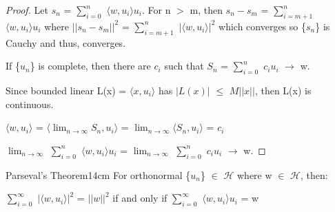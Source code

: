     \begin{proof}
        Let $s_n$ = $\sum_{i=0}^{n}$ $\langle w , u_i \rangle u_i$.
        For n $>$ m, then $s_n - s_m$
        = $\sum_{i=m+1}^{n}$ $\langle w , u_i \rangle u_i$
        where $||s_n - s_m||^2$
        = $\sum_{i=m+1}^{n}$ $|\langle w , u_i \rangle|^2$
        which converges so \{$s_n$\} is Cauchy and thus, converges.

        If \{$u_n$\} is complete, then there are $c_i$ such that
        $S_n$ = $\sum_{i=0}^n$ $c_i u_i$ $\rightarrow$ w.

        Since bounded linear L(x) = $\langle x , u_i \rangle$
        has $|L(x)|$ $\leq$ $M||x||$, then L(x) is continuous.

        \hspace{0.5cm}
        $\langle w , u_i \rangle$
        = $\langle \lim_{n \rightarrow \infty} S_n , u_i \rangle$
        = $\lim_{n \rightarrow \infty} \langle S_n , u_i \rangle$
        = $c_i$

        \hspace{0.5cm}
        $\lim_{n \rightarrow \infty}$ $\sum_{i=0}^{n}$ $\langle w , u_i \rangle u_i$
        = $\lim_{n \rightarrow \infty}$ $\sum_{i=0}^n$ $c_i u_i$ $\rightarrow$ w.
    \end{proof}

    \newpage



    \begin{wtheorem}{Parseval's Theorem}{14cm}
        For orthonormal \{$u_n$\} $\in$ $\mathcal{H}$ where w $\in$ $\mathcal{H}$,
        then:
        
        \hspace{0.5cm}
        $\sum_{i=0}^{\infty}$ $|\langle w , u_i \rangle|^2$ = $||w||^2$
        if and only if $\sum_{i=0}^{\infty}$ $\langle w , u_i \rangle u_i$ = w
    \end{wtheorem}

